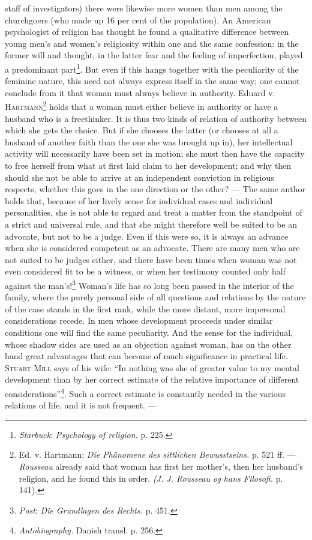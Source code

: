 \documentclass[12pt,a4paper,openany]{book}
\newcommand{\opage}[1]{\marginnote{\footnotesize\textit{[#1]}}}
\begin{document}
staff of investigators) there were likewise more women than men among the churchgoers (who made up 16 per cent of the
population). An American psychologist of religion has thought he found a qualitative difference between young men's and
women's religiosity within one and the same confession: in the former will and thought, in the latter fear and the
feeling of imperfection, played a predominant part\footnote[1]{\emph{Starbuck}: \textit{Psychology of religion.} p.
225.}. But even if this hangs together with the peculiarity of the feminine nature, this need not always express itself
in the same way; one cannot conclude from it that woman must always believe in authority. Eduard v.
\textsc{Hartmann}\footnote[2]{Ed. v. Hartmann: \textit{Die Phänomene des sittlichen Bewusstseins.} p. 521 ff. %
--- \emph{Rousseau} already said that woman has first her mother's, then her husband's religion, and he found this in
order. \textit{(J. J. Rousseau og hans Filosofi.} p. 141).} holds that a woman must either believe in authority or have
a husband who is a freethinker. It is thus two kinds of relation of authority between which she gets the choice. But if
she chooses the latter (or chooses at all a husband of another faith than the one she was brought up in), her
intellectual activity will necessarily have been set in motion; she must then have the capacity to free herself from
what at first laid claim to her development; and why then should she not be able to arrive at an independent conviction
in religious respects, whether this goes in the one direction or the other? --- The same author holds that, because of
her lively sense for individual cases and individual personalities, she is not able to regard and treat a matter from
the standpoint of a strict and universal rule, and that she might therefore well be suited to be an advocate, but not to
be a judge. Even if this were so, it is always an advance when she is considered competent as an advocate. There are
many men who are not suited to be judges either, and there have been times when
\opage{322}woman was not even considered fit to be a witness, or when her testimony counted only half against the
man's!\footnote[1]{\emph{Post}: \textit{Die Grundlagen des Rechts.} p. 451.} Woman's life has so long been passed in the
interior of the family, where the purely personal side of all questions and relations by the nature of the case stands
in the first rank, while the more distant, more impersonal considerations recede. In men whose development proceeds under
similar conditions one will find the same peculiarity. And the sense for the individual, whose shadow sides are used as
an objection against woman, has on the other hand great advantages that can become of much significance in practical
life. \textsc{Stuart Mill} says of his wife: ``In nothing was she of greater value to my mental development than by her
correct estimate of the relative importance of different considerations''\footnote[2]{\textit{Autobiography.} Danish
transl. p. 256.}.%
Such a correct estimate is constantly needed in the various relations of life, and it is not frequent. ---
\end{document}
